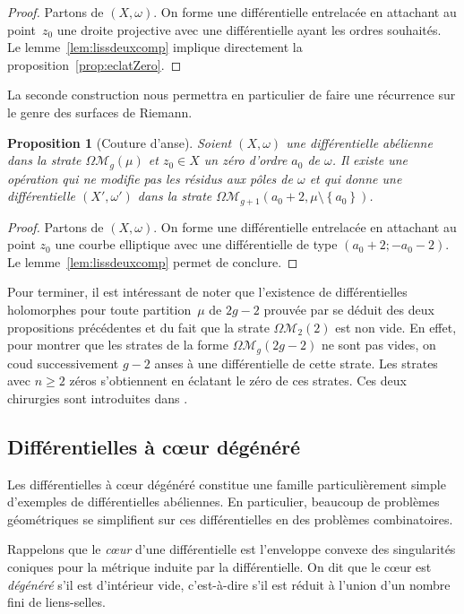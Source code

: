 \documentclass[11pt]{article}
\numberwithin{equation}{section}\renewcommand{\proofname}{Démonstration}
\let\mathcal\mathscr
\newcommand{\omoduli}[1][g]{{\Omega\mathcal M}_{\!#1}}
\newtheorem{prop}[thm]{Proposition}
\theoremstyle{definition}
\begin{document}
\begin{proof}
Partons de $(X,\omega)$. On forme une différentielle entrelacée en attachant au point~$z_{0}$ une droite projective avec une différentielle ayant les ordres souhaités. Le lemme~\ref{lem:lissdeuxcomp} implique directement la proposition~\ref{prop:eclatZero}.
\end{proof}

La seconde construction nous permettra en particulier de faire une récurrence sur le genre des surfaces de Riemann.

\begin{prop}[Couture d'anse]\label{prop:attachanse}
Soient $(X,\omega)$ une différentielle abélienne dans la strate $\omoduli(\mu)$ et $z_{0}\in X$ un zéro d'ordre $a_{0}$ de $\omega$.
Il existe une opération qui ne modifie pas les résidus aux pôles de $\omega$ et qui donne une différentielle $(X',\omega')$ dans la strate $\omoduli[g+1](a_{0}+2,\mu\setminus\left\{a_{0}\right\})$.
\end{prop}
\begin{proof}
Partons de $(X,\omega)$. On forme une différentielle entrelacée en attachant au point $z_{0}$ une courbe elliptique avec une différentielle de type $(a_{0}+2;-a_{0}-2)$. Le lemme~\ref{lem:lissdeuxcomp} permet de conclure.
\end{proof}

Pour terminer, il est intéressant de noter que l'existence de différentielles holomorphes pour toute partition~$\mu$ de $2g-2$ prouvée par \cite{masm} se déduit des deux propositions précédentes et du fait que la strate $\omoduli[2](2)$ est non vide. En effet, pour montrer que les strates de la forme $\omoduli(2g-2)$ ne sont pas vides, on coud successivement $g-2$ anses à une différentielle de cette strate. Les strates avec $n\geq2$ zéros s’obtiennent en éclatant le zéro de ces strates. Ces deux chirurgies sont introduites dans \cite[\S4.2]{kozo}.

\subsection{Différentielles à cœur dégénéré}
\label{sec:coeur}

Les différentielles à cœur dégénéré constitue une famille particulièrement simple d'exemples de différentielles abéliennes. En particulier, beaucoup de problèmes géométriques se simplifient sur ces différentielles en des problèmes combinatoires.

Rappelons que le \emph{cœur} d'une différentielle est l'enveloppe convexe des singularités coniques pour la métrique induite par la différentielle. On dit que le cœur est \textit{dégénéré} s'il est d'intérieur vide, c'est-à-dire s'il est réduit à l'union d'un nombre fini de liens-selles.
\end{document}
